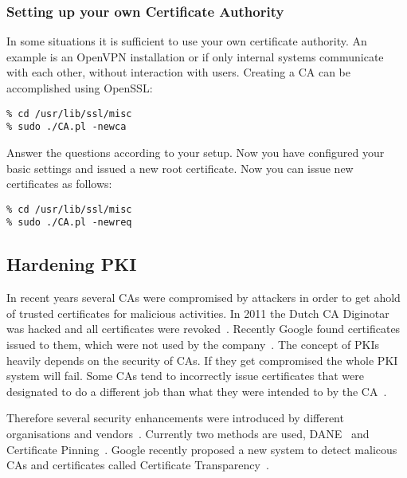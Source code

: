 \subsubsection{Setting up your own Certificate Authority}
\label{sec:setupownca}
In some situations it is sufficient to use your own certificate authority. An example is an OpenVPN
installation or if only internal systems communicate with each other, without interaction with users. 
Creating a CA can be accomplished using OpenSSL:

\begin{lstlisting}
% cd /usr/lib/ssl/misc
% sudo ./CA.pl -newca
\end{lstlisting}

Answer the questions according to your setup. Now you have configured your basic settings and 
issued a new root certificate. Now you can issue new certificates as follows:

\begin{lstlisting}
% cd /usr/lib/ssl/misc
% sudo ./CA.pl -newreq
\end{lstlisting}

\subsection{Hardening PKI}
\label{sec:hardeningpki}
In recent years several CAs were compromised by attackers in order to
get ahold of trusted certificates for malicious activities. In 2011 
the Dutch CA Diginotar was hacked and all certificates were
revoked~\cite{diginotar-hack}. Recently Google found certificates
issued to them, which were not used by the
company~\cite{googlecahack}. The concept of PKIs heavily depends on the
security of CAs.  If they get compromised the whole PKI system will
fail. Some CAs tend to incorrectly issue certificates that were designated
to do a different job than what they were intended to by the CA~\cite{gocode}.

Therefore several security enhancements were introduced by different
organisations and vendors~\cite{tschofenig-webpki}. Currently two
methods are used, DANE~\cite{rfc6698} and Certificate
Pinning~\cite{draft-ietf-websec-key-pinning}. Google recently proposed
a new system to detect malicous CAs and certificates  called Certificate 
Transparency~\cite{certtransparency}.



